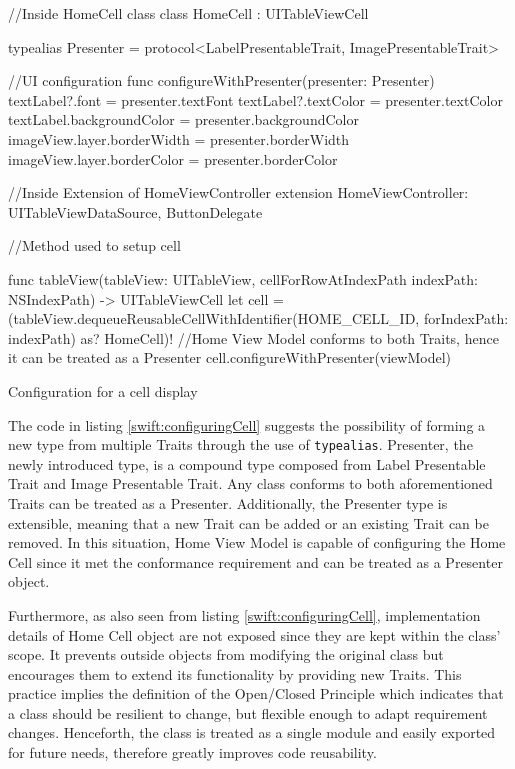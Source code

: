 \documentclass[11pt,a4paper,oneside,article]{memoir}
\begin{document}
\begin{listing}[H]
\begin{SwiftCode}
//Inside HomeCell class
class HomeCell : UITableViewCell {
    typealias Presenter = protocol<LabelPresentableTrait, ImagePresentableTrait>
    
    //UI configuration
    func configureWithPresenter(presenter: Presenter){
        textLabel?.font = presenter.textFont
        textLabel?.textColor = presenter.textColor
        textLabel.backgroundColor = presenter.backgroundColor
        imageView.layer.borderWidth = presenter.borderWidth
        imageView.layer.borderColor = presenter.borderColor
    }
}

//Inside Extension of HomeViewController
extension HomeViewController: UITableViewDataSource, ButtonDelegate{
    //Method used to setup cell

    func tableView(tableView: UITableView, cellForRowAtIndexPath indexPath: NSIndexPath) -> UITableViewCell {
        let cell = (tableView.dequeueReusableCellWithIdentifier(HOME_CELL_ID, forIndexPath: indexPath) as? HomeCell)!
        //Home View Model conforms to both Traits, hence it can be treated as a Presenter
        cell.configureWithPresenter(viewModel)               
    }
}
\end{SwiftCode}
\caption{Configuration for a cell display}
\label{swift:configuringCell}
\end{listing}

The code in listing \ref{swift:configuringCell} suggests the possibility of forming a new type from multiple Traits through the use of \texttt{typealias}. Presenter, the newly introduced type, is a compound type composed from Label Presentable Trait and Image Presentable Trait. Any class conforms to both aforementioned Traits can be treated as a Presenter. Additionally, the Presenter type is extensible, meaning that a new Trait can be added or an existing Trait can be removed. In this situation, Home View Model is capable of configuring the Home Cell since it met the conformance requirement and can be treated as a Presenter object.

Furthermore, as also seen from listing \ref{swift:configuringCell}, implementation details of Home Cell object are not exposed since they are kept within the class' scope. It prevents outside objects from modifying the original class but encourages them to extend its functionality by providing new Traits. This practice implies the definition of the Open/Closed Principle which indicates that a class should be resilient to change, but flexible enough to adapt requirement changes\cite[p. 179]{unclebob:agile}. Henceforth, the class is treated as a single module and easily exported for future needs, therefore greatly improves code reusability. 
\end{document}
